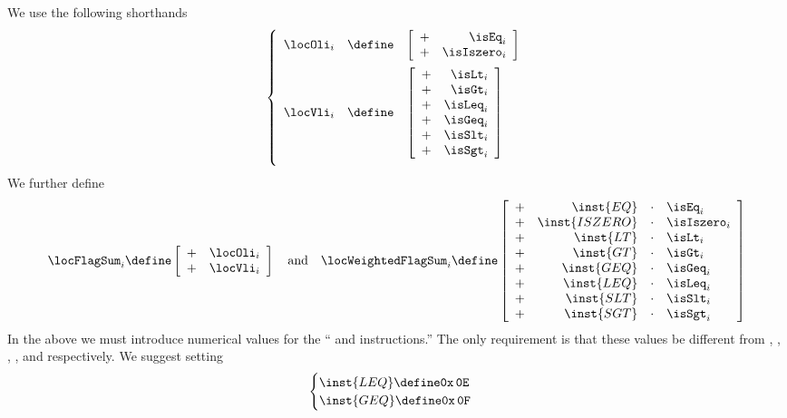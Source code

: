 We use the following shorthands
\[
	\left\{ \begin{array}{lcl}
		\locOli_{i} & \define & 
		\left[ \begin{array}{cr}
		+ & \isEq         _{i}   \\
		+ & \isIszero     _{i}   \\
		\end{array} \right] \vspace{2mm} \\
		\locVli_{i} & \define &
		\left[ \begin{array}{cr}
			+ & \isLt          _{i}   \\
			+ & \isGt          _{i}   \\
			+ & \isLeq         _{i}   \\
			+ & \isGeq         _{i}   \\
			+ & \isSlt         _{i}   \\
			+ & \isSgt         _{i}   \\
		\end{array} \right] \vspace{2mm} \\
	\end{array} \right.
\]
We further define
\[
	\locFlagSum_{i} \define
	\left[ \begin{array}{cr}
		+ & \locOli         _{i}   \\
		+ & \locVli         _{i}   \\
	\end{array} \right]
	\quad\text{and}\quad
	\locWeightedFlagSum_{i} \define
	\left[ \begin{array}{crcl}
		+ & \inst{EQ}         & \cdot & \isEq         _{i}   \\
		+ & \inst{ISZERO}     & \cdot & \isIszero     _{i}   \\
		+ & \inst{LT}         & \cdot & \isLt         _{i}   \\
		+ & \inst{GT}         & \cdot & \isGt         _{i}   \\
		+ & \inst{GEQ}        & \cdot & \isGeq        _{i}   \\
		+ & \inst{LEQ}        & \cdot & \isLeq        _{i}   \\
		+ & \inst{SLT}        & \cdot & \isSlt        _{i}   \\
		+ & \inst{SGT}        & \cdot & \isSgt        _{i}   \\
	\end{array} \right]
\]
\saNote{} In the above we must introduce numerical values for the `` and  instructions.''
The only requirement is that these values be different from 
, , , ,  and  respectively.
We suggest setting
\[
	\begin{cases}
		\inst{LEQ} \define \texttt{0x\,0E} \\
		\inst{GEQ} \define \texttt{0x\,0F} \\
	\end{cases}
\]
